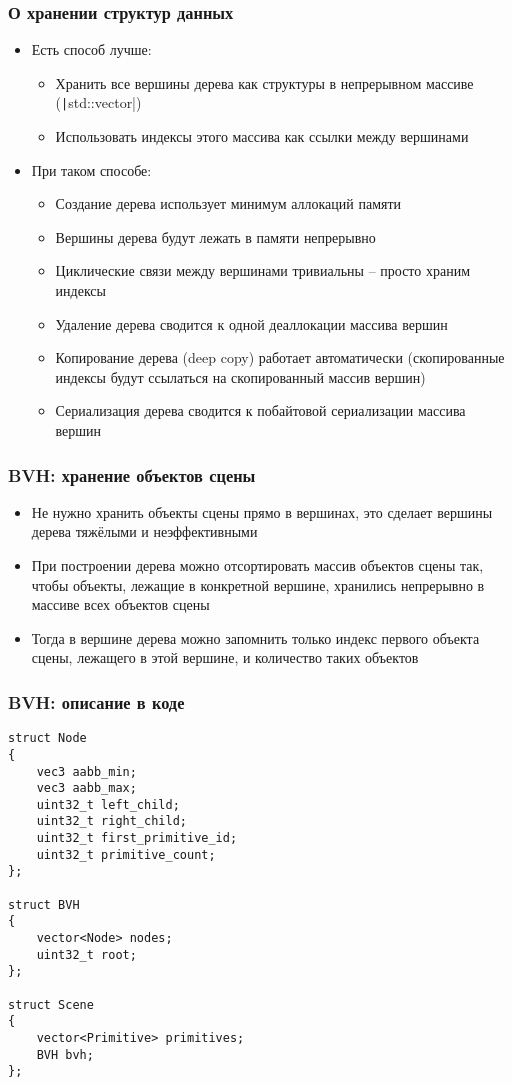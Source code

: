 \documentclass[10pt]{beamer}
\begin{document}
\begin{frame}[fragile]
\frametitle{О хранении структур данных}
\begin{itemize}
\item Есть способ лучше:
\pause
\begin{itemize}
\item Хранить все вершины дерева как структуры в непрерывном массиве (\texttt|std::vector|)
\pause
\item Использовать индексы этого массива как ссылки между вершинами
\end{itemize}
\pause
\item При таком способе:
\pause
\begin{itemize}
\item Создание дерева использует минимум аллокаций памяти
\pause
\item Вершины дерева будут лежать в памяти непрерывно
\pause
\item Циклические связи между вершинами тривиальны -- просто храним индексы
\pause
\item Удаление дерева сводится к одной деаллокации массива вершин
\pause
\item Копирование дерева (deep copy) работает автоматически (скопированные индексы будут ссылаться на скопированный массив вершин)
\pause
\item Сериализация дерева сводится к побайтовой сериализации массива вершин
\end{itemize}
\end{itemize}
\end{frame}

\begin{frame}[fragile]
\frametitle{BVH: хранение объектов сцены}
\begin{itemize}
\item Не нужно хранить объекты сцены прямо в вершинах, это сделает вершины дерева тяжёлыми и неэффективными
\pause
\item При построении дерева можно отсортировать массив объектов сцены так, чтобы объекты, лежащие в конкретной вершине, хранились непрерывно в массиве всех объектов сцены
\pause
\item Тогда в вершине дерева можно запомнить только индекс первого объекта сцены, лежащего в этой вершине, и количество таких объектов
\end{itemize}
\end{frame}

\begin{frame}[fragile]
\frametitle{BVH: описание в коде}
\begin{verbatim}
struct Node
{
    vec3 aabb_min;
    vec3 aabb_max;
    uint32_t left_child;
    uint32_t right_child;
    uint32_t first_primitive_id;
    uint32_t primitive_count;
};

struct BVH
{
    vector<Node> nodes;
    uint32_t root;
};

struct Scene
{
    vector<Primitive> primitives;
    BVH bvh;
};
\end{verbatim}
\end{frame}
\end{document}
